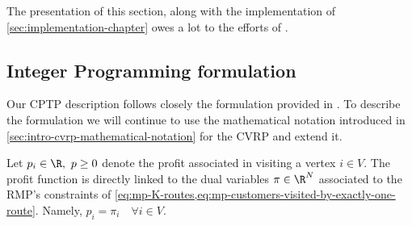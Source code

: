 The presentation of this section, along with the implementation of \cref{sec:implementation-chapter}
owes a lot to the efforts of \textcite{jepsen2014}.

\subsection{Integer Programming formulation}
\label{sec:cptp-integer-programming-formulation}

Our CPTP description follows closely the formulation provided in \textcite{jepsen2014}.
To describe the formulation
we will continue to use the mathematical notation introduced in \cref{sec:intro-cvrp-mathematical-notation}
for the CVRP and extend it.

Let $p_i \in \R,\ p \ge 0$ denote the profit associated in visiting a vertex $i \in V$.
The profit function is directly linked to the dual variables $\pi \in \R^N$ associated to
the RMP's constraints of \cref{eq:mp-K-routes,eq:mp-customers-visited-by-exactly-one-route}.
Namely, $p_i = \pi_i \quad \forall i \in V$.

